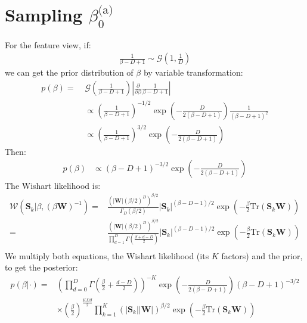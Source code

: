 \documentclass[smallextended]{svjour3}          %
\newcommand{\betaoa}{\beta_{0}^\text{(a)}}
\begin{document}
\section{Sampling $\betaoa$}
For the feature view, if:
\begin{align*}
\frac{1}{\beta - D + 1} \sim \mathcal{G}(1, \frac{1}{D})
\end{align*}
we can get the prior distribution of $\beta$ by variable transformation:
\begin{align*}
p(\beta) =\;& \mathcal{G}(\frac{1}{\beta-D+1})|\frac{\partial}{\partial \beta}\frac{1}{\beta-D+1}|\\
&\propto \left(\frac{1}{\beta-D+1}\right)^{-1/2} \exp\left(-\frac{D}{2(\beta-D+1)}\right)
\frac{1}{(\beta-D+1)^2}\\
&\propto \left(\frac{1}{\beta-D+1}\right)^{3/2} \exp\left(-\frac{D}{2(\beta-D+1)}\right)
\end{align*}
Then:
\begin{align*}
p(\beta) &\propto  (\beta - D + 1)^{-3/2} \exp\left( -\frac{D}{2(\beta - D +1)}\right)
\end{align*}
The Wishart likelihood is:
\begin{align*}
\mathcal{W}(\mathbf{S}_k | \beta, (\beta\mathbf{W})^{-1})
=&
\frac{(|\mathbf{W}| (\beta/2)^D)^{\beta/2}}{\Gamma_D(\beta/2)}
|\mathbf{S}_k|^{(\beta-D-1)/2} 
\exp\left(- \frac{\beta}{2}\text{Tr}(\mathbf{S}_k\mathbf{W})\right)\\
=&
\frac{(|\mathbf{W}| (\beta/2)^D)^{\beta/2}}{\prod_{d=1}^{D} \Gamma(\frac{\beta+d-D}{2})}
|\mathbf{S}_k|^{(\beta-D-1)/2}
\exp\left(- \frac{\beta}{2}\text{Tr}(\mathbf{S}_k\mathbf{W})\right)\\
\end{align*}
We multiply both equations, the Wishart likelihood (its $K$ factors) and the prior, to get the posterior:
\begin{align*}
p(\beta | \cdot) =& 
 \left(\prod_{d=0}^D \Gamma (\frac{\beta}{2} + \frac{d-D}{2}) \right)^{-K}
\exp\left(-\frac{D}{2(\beta-D+1)}  \right)
(\beta-D+1)^{-3/2}
\\&\times
(\frac{\beta}{2})^{\frac{KD\beta}{2}}
\prod_{k=1}^K (|\mathbf{S}_k||\mathbf{W}|)^{\beta/2} \exp\left(-\frac{\beta}{2} \text{Tr}(\mathbf{S}_k\mathbf{W})\right)
\end{align*}
\end{document}
